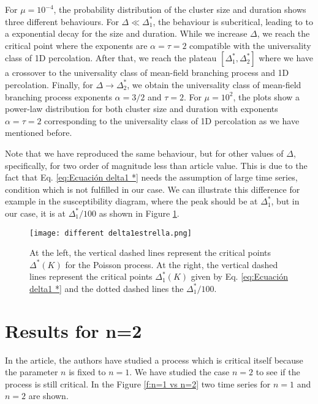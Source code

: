 For $\mu=10^{-4}$, the probability distribution of the cluster size and duration shows three different behaviours. For $\Delta\ll\Delta_1^*$, the behaviour is subcritical, leading to
to a exponential decay for the size and duration. While we increase $\Delta$, we reach the critical point where the exponents are $\alpha=\tau=2$ compatible with the universality class
of 1D percolation. After that, we reach the plateau $[\Delta_1^*,\Delta_2^*]$ where we have a crossover to the universality class of mean-field branching process and 1D percolation. 
Finally, for $\Delta\to\Delta_2^*$, we obtain the universality class of mean-field branching process exponents $\alpha=3/2$ and $\tau=2$. 
For $\mu=10^2$, the plots show a power-law distribution for both cluster size and duration with exponents $\alpha=\tau=2$ corresponding to the universality class of 1D percolation as we have
mentioned before.  

Note that we have reproduced the same behaviour, but for other values of $\Delta$, specifically, for two order of magnitude less than article value. This is due 
to the fact that Eq. \ref{eq:Ecuación delta1 *} needs the assumption of large time series, condition which is not fulfilled in our case. We can illustrate this difference 
for example in the susceptibility diagram, where the peak should be at $\Delta_1^*$, but in our case, it is at $\Delta_1^*/100$ as shown in Figure \ref{f:different delta1estrella}. 

\begin{figure}[H]
\centering
\texttt{[image: different delta1estrella.png]}
\caption{At the left, the vertical dashed lines represent the critical points $\Delta^*(K)$ for the Poisson process. At the right, the vertical dashed lines represent 
the critical points $\Delta_1^*(K)$ given by Eq. \ref{eq:Ecuación delta1 *} and the dotted dashed lines the $\Delta_1^*/100$.} 
\label{f:different delta1estrella}
\end{figure}




\section{Results for n=2}

In the article, the authors have studied a process which is critical itself because the parameter $n$ is fixed to $n=1$. We have studied the case $n=2$ to see if the process is still critical. 
In the Figure \ref{f:n=1 vs n=2} two time series for $n=1$ and $n=2$ are shown. 

